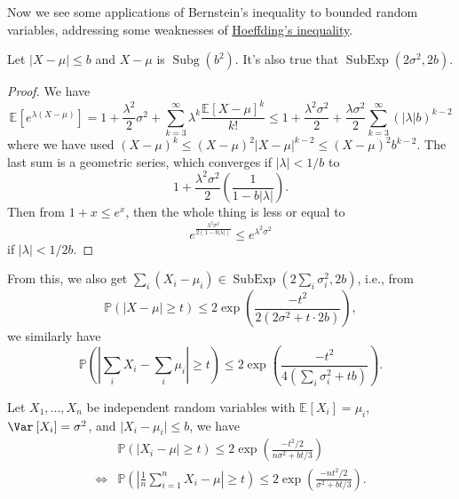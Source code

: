 Now we see some applications of Bernstein's inequality to bounded random variables, addressing some weaknesses of \hyperref[thm:Hoeffding-inequality]{Hoeffding's inequality}.

\begin{lemma}
	Let \(\vert X - \mu \vert \leq b\) and \(X - \mu \) is \(\mathop{\mathrm{Subg}}(b^2) \). It's also true that \(\mathop{\mathrm{SubExp}}(2 \sigma ^{2} , 2b) \).
\end{lemma}
\begin{proof}
	We have
	\[
		\mathbb{E}_{}\left[e^{\lambda (X - \mu )} \right]
		= 1 + \frac{\lambda ^{2} }{2} \sigma ^{2} + \sum_{k=3}^{\infty} \lambda ^k \frac{\mathbb{E}_{}\left[X - \mu  \right] ^k}{k!}
		\leq 1 + \frac{\lambda ^2 \sigma ^2}{2} + \frac{\lambda \sigma ^2}{2} \sum_{k=3}^{\infty} (\vert \lambda  \vert b)^{k - 2}
	\]
	where we have used \((X - \mu )^k \leq (X - \mu )^2 \vert X - \mu \vert ^{k - 2} \leq (X - \mu )^2 b^{k-2}\). The last sum is a geometric series, which converges if \(\vert \lambda  \vert < 1 / b\) to
	\[
		1 + \frac{\lambda ^2 \sigma ^2}{2} \left( \frac{1}{1 - b \vert \lambda \vert } \right) .
	\]
	Then from \(1 + x \leq e^x\), then the whole thing is less or equal to
	\[
		e^{\frac{\lambda ^2 \sigma ^{2} }{2(1 - b \vert \lambda \vert )}} \leq e^{\lambda ^{2} \sigma ^{2} }
	\]
	if \(\vert \lambda  \vert < 1 / 2b\).
\end{proof}

From this, we also get \(\sum_{i} (X_i - \mu _i) \in \mathop{\mathrm{SubExp}}(2 \sum_{i} \sigma _i^{2} , 2b) \), i.e., from
\[
	\mathbb{P} (\vert X - \mu  \vert \geq t) \leq 2 \exp \left( \frac{- t^2}{2(2\sigma ^{2} + t\cdot 2b)} \right),
\]
we similarly have
\[
	\mathbb{P} \left( \left\vert \sum_{i} X_i - \sum_{i} \mu _i \right\vert \geq t \right) \leq 2 \exp \left( \frac{-t^2}{4\left( \sum_{i} \sigma _i^2 + tb\right) } \right).
\]

\begin{corollary}
	Let \(X_1, \dots , X_n\) be independent random variables with \(\mathbb{E}_{}\left[X_i \right] = \mu _i\), \(\Var_{}\left[X_i \right] = \sigma ^{2}\), and \(\vert X_i - \mu _i \vert \leq b\), we have
	\[
		\begin{split}
			&\mathbb{P} \left( \left\vert X_i - \mu  \right\vert \geq t \right) \leq 2 \exp \left( \frac{- t^2 / 2}{n \sigma ^{2} + bt / 3 } \right) \\
			\iff & \mathbb{P} \left( \left\vert \frac{1}{n}\sum_{i=1}^{n} X_i - \mu \right\vert \geq t \right) \leq 2 \exp \left( \frac{- nt^2 / 2}{\sigma ^{2} + bt / 3} \right).
		\end{split}
	\]
\end{corollary}

